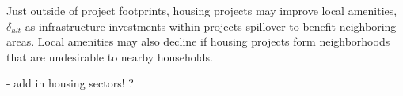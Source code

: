 \documentclass[12pt]{article}
\begin{document}
Just outside of project footprints, housing projects may improve local amenities, $\delta_{hlt}$  as infrastructure investments within projects spillover to benefit neighboring areas.  Local amenities may also decline if housing projects form neighborhoods that are undesirable to nearby households.






- add in housing sectors!  ?











\end{document}
